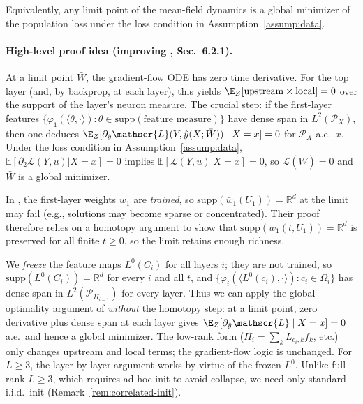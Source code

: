 \documentclass[nohyperref]{article}
\theoremstyle{plain}
\theoremstyle{definition}
\theoremstyle{remark}
\begin{document}
Equivalently, any limit point of the mean-field dynamics is a global minimizer of the population loss under the loss condition in Assumption~\ref{assump:data}.

\paragraph{High-level proof idea (improving \cite{nguyen2023rigorousframeworkmeanfield}, Sec.~6.2.1).}
At a limit point $\bar W$, the gradient-flow ODE has zero time derivative. For the top layer (and, by backprop, at each layer), this yields $\E_Z[\text{upstream} \times \text{local}] = 0$ over the support of the layer's neuron measure. The crucial step: if the first-layer features $\{\varphi_1(\langle \theta, \cdot \rangle) : \theta \in \text{supp}(\text{feature measure})\}$ have dense span in $L^2(\mathcal{P}_X)$, then one deduces $\E_Z[\partial_{\hat{y}}\mathscr{L}(Y,\hat{y}(X;\bar W)) \mid X=x]=0$ for $\mathcal{P}_X$-a.e.\ $x$. Under the loss condition in Assumption~\ref{assump:data}, $\mathbb{E}[\partial_2\mathcal{L}(Y,u)|X=x]=0$ implies $\mathbb{E}[\mathcal{L}(Y,u)|X=x]=0$, so $\mathscr{L}(\bar W)=0$ and $\bar W$ is a global minimizer.

In \cite{nguyen2023rigorousframeworkmeanfield}, the first-layer weights $w_1$ are \emph{trained}, so $\text{supp}(\bar w_1(U_1)) = \mathbb{R}^d$ at the limit may fail (e.g., solutions may become sparse or concentrated). Their proof therefore relies on a homotopy argument to show that $\text{supp}(w_1(t, U_1)) = \mathbb{R}^d$ is preserved for all finite $t \ge 0$, so the limit retains enough richness. 

We \emph{freeze} the feature maps $L^0(C_i)$ for all layers $i$; they are not trained, so $\text{supp}(L^0(C_i)) = \mathbb{R}^d$ for every $i$ and all $t$, and $\{\varphi_i(\langle L^0(c_i), \cdot \rangle) : c_i \in \Omega_i\}$ has dense span in $L^2(\mathcal{P}_{H_{i-1}})$ for every layer. Thus we can apply the global-optimality argument of \cite{nguyen2023rigorousframeworkmeanfield} \emph{without} the homotopy step: at a limit point, zero derivative plus dense span at each layer gives $\E_Z[\partial_{\hat{y}}\mathscr{L} \mid X = x] = 0$ a.e.\ and hence a global minimizer. The low-rank form ($H_i = \sum_k L_{c_i,k} f_k$, etc.) only changes upstream and local terms; the gradient-flow logic is unchanged. For $L \geq 3$, the layer-by-layer argument works by virtue of the frozen $L^0$. Unlike full-rank $L \geq 3$, which requires ad-hoc init to avoid collapse, we need only standard i.i.d.\ init (Remark~\ref{rem:correlated-init}).
\end{document}
